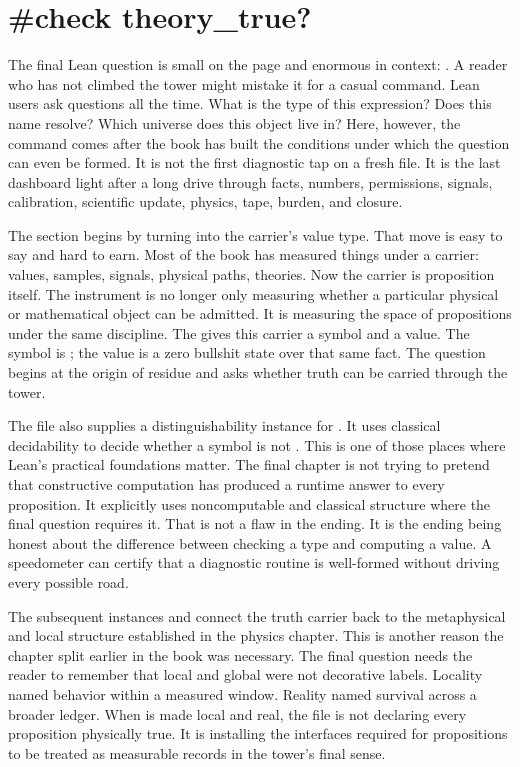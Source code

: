 \section{\#check theory\_true?}
\label{se:check-theory-true}

The final Lean question is small on the page and enormous in context:
. A reader who has not climbed the tower might
mistake it for a casual command. Lean users ask  questions all
the time. What is the type of this expression? Does this name resolve? Which
universe does this object live in? Here, however, the command comes after the
book has built the conditions under which the question can even be formed. It
is not the first diagnostic tap on a fresh file. It is the last dashboard
light after a long drive through facts, numbers, permissions, signals,
calibration, scientific update, physics, tape, burden, and closure.

The section begins by turning  into the carrier's value type.
That move is easy to say and hard to earn. Most of the book has measured
things under a carrier: values, samples, signals, physical paths, theories.
Now the carrier is proposition itself. The instrument is no longer only
measuring whether a particular physical or mathematical object can be admitted.
It is measuring the space of propositions under the same discipline. The
 gives this carrier a symbol and a value. The symbol is
; the value is a zero bullshit state over that same fact. The
question begins at the origin of residue and asks whether truth can be carried
through the tower.

The file also supplies a distinguishability instance for . It uses
classical decidability to decide whether a symbol is not . This is
one of those places where Lean's practical foundations matter. The final
chapter is not trying to pretend that constructive computation has produced a
runtime answer to every proposition. It explicitly uses noncomputable and
classical structure where the final question requires it. That is not a flaw
in the ending. It is the ending being honest about the difference between
checking a type and computing a value. A speedometer can certify that a
diagnostic routine is well-formed without driving every possible road.

The subsequent instances  and  connect the
truth carrier back to the metaphysical and local structure established in the
physics chapter. This is another reason the chapter split earlier in the book
was necessary. The final question needs the reader to remember that local and
global were not decorative labels. Locality named behavior within a measured
window. Reality named survival across a broader ledger. When  is
made local and real, the file is not declaring every proposition physically
true. It is installing the interfaces required for propositions to be treated
as measurable records in the tower's final sense.


